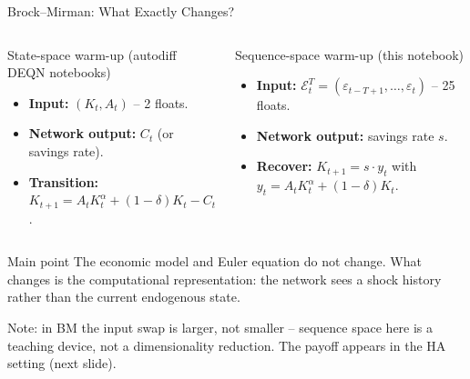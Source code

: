 \documentclass[aspectratio=169,11pt]{beamer}
\newcommand{\emphc}[1]{\textcolor{harvardcrimson}{#1}}
\newcommand{\E}{\mathcal{E}}
\begin{document}
\begin{frame}{Brock--Mirman: What Exactly Changes?}
\small
\begin{columns}[T]
\begin{block}{State-space warm-up (autodiff DEQN notebooks)}
\begin{itemize}\itemsep3pt
    \item \textbf{Input:} $(K_t, A_t)$ -- 2 floats.
    \item \textbf{Network output:} $C_t$ (or savings rate).
    \item \textbf{Transition:} $K_{t+1} = A_t K_t^\alpha + (1-\delta) K_t - C_t$.
\end{itemize}
\end{block}

\begin{block}{Sequence-space warm-up (this notebook)}
\begin{itemize}\itemsep3pt
    \item \textbf{Input:} $\E_t^T = (\varepsilon_{t-T+1}, \ldots, \varepsilon_t)$ -- 25 floats.
    \item \textbf{Network output:} savings rate $s$.
    \item \textbf{Recover:} $K_{t+1} = s\cdot y_t$ with $y_t = A_t K_t^\alpha + (1-\delta) K_t$.
\end{itemize}
\end{block}
\end{columns}

\vspace{0.30em}
\begin{alertblock}{Main point}
The \emphc{economic model and Euler equation do not change}.  What changes is the \emphc{computational representation}: the network sees a shock history rather than the current endogenous state.
\end{alertblock}

\vspace{0.20em}
{\footnotesize Note: in BM the input swap is \emphc{larger}, not smaller -- sequence space here is a teaching device, not a dimensionality reduction.  The payoff appears in the HA setting (next slide).}
\end{frame}
\end{document}
